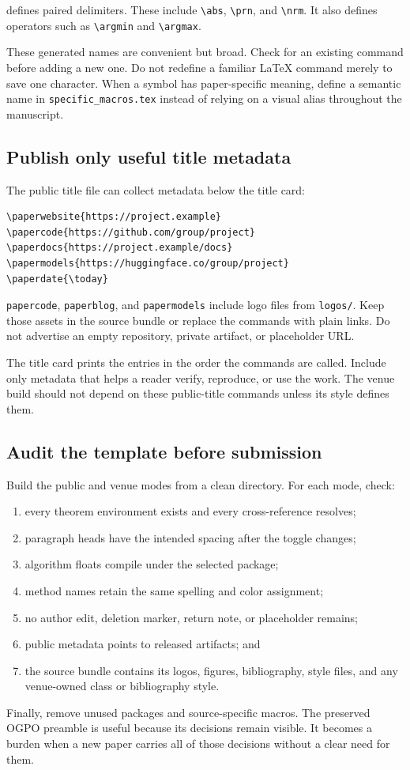  defines paired delimiters. These include
\texttt{\textbackslash abs}, \texttt{\textbackslash prn}, and
\texttt{\textbackslash nrm}. It also defines operators such as
\texttt{\textbackslash argmin} and \texttt{\textbackslash argmax}.

These generated names are convenient but broad. Check for an existing command
before adding a new one. Do not redefine a familiar LaTeX command merely to
save one character. When a symbol has paper-specific meaning, define a
semantic name in \texttt{specific\_macros.tex} instead of relying on a visual
alias throughout the manuscript.

\subsection{Publish only useful title metadata}

The public title file can collect metadata below the title card:

\begin{verbatim}
\paperwebsite{https://project.example}
\papercode{https://github.com/group/project}
\paperdocs{https://project.example/docs}
\papermodels{https://huggingface.co/group/project}
\paperdate{\today}
\end{verbatim}

\texttt{papercode}, \texttt{paperblog}, and \texttt{papermodels} include logo
files from \texttt{logos/}. Keep those assets in the source bundle or replace
the commands with plain links. Do not advertise an empty repository, private
artifact, or placeholder URL.

The title card prints the entries in the order the commands are called. Include
only metadata that helps a reader verify, reproduce, or use the work. The venue
build should not depend on these public-title commands unless its style defines
them.

\subsection{Audit the template before submission}

Build the public and venue modes from a clean directory. For each mode, check:

\begin{enumerate}[leftmargin=*]
    \item every theorem environment exists and every cross-reference resolves;
    \item paragraph heads have the intended spacing after the toggle changes;
    \item algorithm floats compile under the selected package;
    \item method names retain the same spelling and color assignment;
    \item no author edit, deletion marker, return note, or placeholder remains;
    \item public metadata points to released artifacts; and
    \item the source bundle contains its logos, figures, bibliography, style
    files, and any venue-owned class or bibliography style.
\end{enumerate}

Finally, remove unused packages and source-specific macros. The preserved OGPO
preamble is useful because its decisions remain visible. It becomes a burden
when a new paper carries all of those decisions without a clear need for them.
